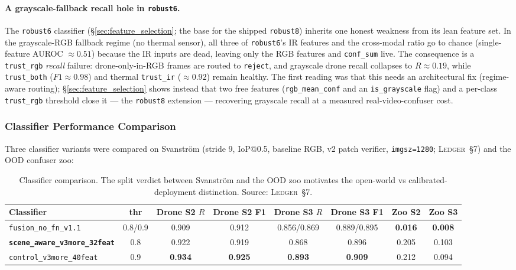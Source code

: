 \paragraph{A grayscale-fallback recall hole in \texttt{robust6}.}
The \texttt{robust6} classifier (\S\ref{sec:feature_selection}; the base for the shipped \texttt{robust8}) inherits one honest weakness from its lean feature set. In the grayscale-RGB fallback regime (no thermal sensor), all three of \texttt{robust6}'s IR features and the cross-modal ratio go to chance (single-feature AUROC $\approx 0.51$) because the IR inputs are dead, leaving only the RGB features and \texttt{conf\_sum} live. The consequence is a \texttt{trust\_rgb} \emph{recall} failure: drone-only-in-RGB frames are routed to \texttt{reject}, and grayscale drone recall collapses to $R\approx0.19$, while \texttt{trust\_both} ($F1\approx0.98$) and thermal \texttt{trust\_ir} ($\approx0.92$) remain healthy. The first reading was that this needs an architectural fix (regime-aware routing); \S\ref{sec:feature_selection} shows instead that two free features (\texttt{rgb\_mean\_conf} and an \texttt{is\_grayscale} flag) and a per-class \texttt{trust\_rgb} threshold close it --- the \texttt{robust8} extension --- recovering grayscale recall at a measured real-video-confuser cost.

\subsubsection{Classifier Performance Comparison}
\label{sec:classifier_compare}

Three classifier variants were compared on Svanstr\"om (stride 9, IoP@0.5, baseline RGB, v2 patch verifier, \texttt{imgsz=1280}; \textsc{Ledger}~\S7) and the OOD confuser zoo:

\begin{table}[htbp]
    \centering
    \caption{Classifier comparison. The split verdict between Svanstr\"om and the OOD zoo motivates the open-world vs calibrated-deployment distinction. Source: \textsc{Ledger}~\S7.}
    \label{tab:classifiers}
    \begin{tabular}{lccccccc}
        \toprule
        Classifier & thr & Drone S2 $R$ & Drone S2 F1 & Drone S3 $R$ & Drone S3 F1 & Zoo S2 & Zoo S3 \\
        \midrule
        \texttt{fusion\_no\_fn\_v1.1}        & 0.8/0.9 & 0.909 & 0.912 & 0.856/0.869 & 0.889/0.895 & \textbf{0.016} & \textbf{0.008} \\
        \textbf{\texttt{scene\_aware\_v3more\_32feat}} & 0.8 & 0.922 & 0.919 & 0.868 & 0.896 & 0.205 & 0.103 \\
        \texttt{control\_v3more\_40feat} & 0.9 & \textbf{0.934} & \textbf{0.925} & \textbf{0.893} & \textbf{0.909} & 0.212 & 0.094 \\
        \bottomrule
    \end{tabular}
\end{table}

